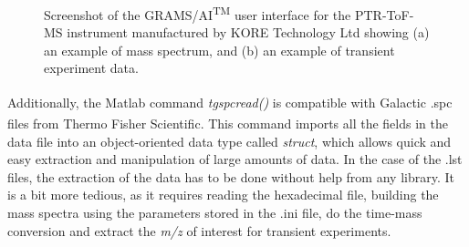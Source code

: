 \begin{figure}%
\centering
{}

\caption{Screenshot of the GRAMS/AI\textsuperscript{TM} user interface for the PTR-ToF-MS instrument manufactured by KORE Technology Ltd showing (a) an example of mass spectrum, and (b) an example of transient experiment data.}
\label{fig:grams}
\end{figure}



Additionally, the Matlab\textsuperscript{\textregistered} command \textit{tgspcread()} is compatible with  Galactic .spc files from Thermo Fisher Scientific\textsuperscript{\textregistered}.
%
This command imports all the fields in the data file into an object-oriented data type called \textit{struct}, which allows quick and easy extraction and manipulation of large amounts of data.
 In the case of the .lst files, the extraction of the data has to be done without help from any library. It is a bit more tedious, as it requires reading the hexadecimal file, building the mass spectra using the parameters stored in the .ini file, do the time-mass conversion and  extract the \textit{m/z} of interest for transient experiments.
 



